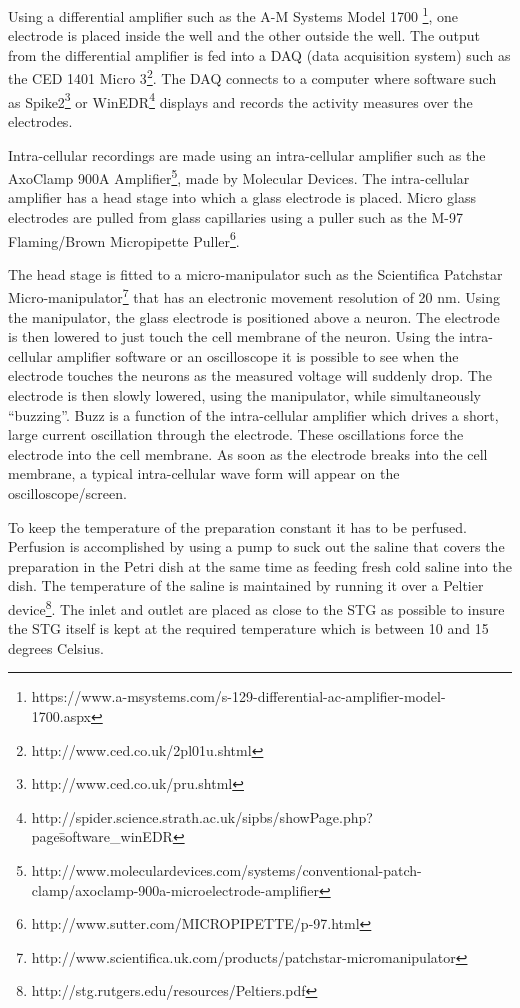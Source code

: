 Using a differential amplifier such as the A-M Systems Model 1700 \footnote{https://www.a-msystems.com/s-129-differential-ac-amplifier-model-1700.aspx}, one electrode is placed inside the well and the other outside the well. The output from the differential amplifier is fed into a DAQ (data acquisition system) such as the CED 1401 Micro 3\footnote{http://www.ced.co.uk/2pl01u.shtml}. The DAQ connects to a computer where software such as Spike2\footnote{http://www.ced.co.uk/pru.shtml} or WinEDR\footnote{http://spider.science.strath.ac.uk/sipbs/showPage.php?page\=software\_winEDR} displays and records the activity measures over the electrodes.

Intra-cellular recordings are made using an intra-cellular amplifier such as the AxoClamp 900A Amplifier\footnote{http://www.moleculardevices.com/systems/conventional-patch-clamp/axoclamp-900a-microelectrode-amplifier}, made by Molecular Devices. The intra-cellular amplifier has a head stage into which a glass electrode is placed. Micro glass electrodes are pulled from glass capillaries using a puller such as the M-97 Flaming/Brown Micropipette Puller\footnote{http://www.sutter.com/MICROPIPETTE/p-97.html}.

The head stage is fitted to a micro-manipulator such as the Scientifica Patchstar Micro-manipulator\footnote{http://www.scientifica.uk.com/products/patchstar-micromanipulator}  that has an electronic movement resolution of 20 nm. Using the manipulator, the glass electrode is positioned above a neuron. The electrode is then lowered to just touch the cell membrane of the neuron. Using the intra-cellular amplifier software or an oscilloscope it is possible to see when the electrode touches the neurons as the measured voltage will suddenly drop. The electrode is then slowly lowered, using the manipulator, while simultaneously ``buzzing''. Buzz is a function of the intra-cellular amplifier which drives a short, large current oscillation through the electrode. These oscillations force the electrode into the cell membrane. As soon as the electrode breaks into the cell membrane, a typical intra-cellular wave form will appear on the oscilloscope/screen.

To keep the temperature of the preparation constant it has to be perfused. Perfusion is accomplished by using a pump to suck out the saline that covers the preparation in the Petri dish at the same time as feeding fresh cold saline into the dish. The temperature of the saline is maintained by running it over a Peltier device\footnote{http://stg.rutgers.edu/resources/Peltiers.pdf}. The inlet and outlet are placed as close to the \ac{STG} as possible to insure the \ac{STG} itself is kept at the required temperature which is between 10 and 15 degrees Celsius.

